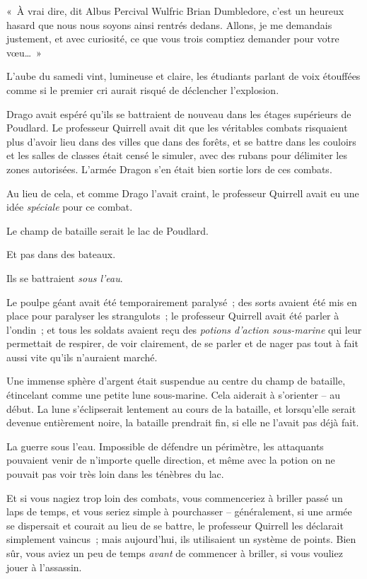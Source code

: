 «~À vrai dire, dit Albus Percival Wulfric Brian Dumbledore, c'est un heureux hasard que nous nous soyons ainsi rentrés dedans. Allons, je me demandais justement, et avec curiosité, ce que vous trois comptiez demander pour votre vœu…~»

\later

L'aube du samedi vint, lumineuse et claire, les étudiants parlant de voix étouffées comme si le premier cri aurait risqué de déclencher l'explosion.

\later

Drago avait espéré qu'ils se battraient de nouveau dans les étages supérieurs de Poudlard. Le professeur Quirrell avait dit que les véritables combats risquaient plus d'avoir lieu dans des villes que dans des forêts, et se battre dans les couloirs et les salles de classes était censé le simuler, avec des rubans pour délimiter les zones autorisées. L'armée Dragon s'en était bien sortie lors de ces combats.

Au lieu de cela, et comme Drago l'avait craint, le professeur Quirrell avait eu une idée \emph{spéciale} pour ce combat.

Le champ de bataille serait le lac de Poudlard.

Et pas dans des bateaux.

Ils se battraient \emph{sous l'eau}.

Le poulpe géant avait été temporairement paralysé~; des sorts avaient été mis en place pour paralyser les strangulots~; le professeur Quirrell avait été parler à l'ondin~; et tous les soldats avaient reçu des \emph{potions d'action sous-marine} qui leur permettait de respirer, de voir clairement, de se parler et de nager pas tout à fait aussi vite qu'ils n'auraient marché.

Une immense sphère d'argent était suspendue au centre du champ de bataille, étincelant comme une petite lune sous-marine. Cela aiderait à s'orienter -- au début. La lune s'éclipserait lentement au cours de la bataille, et lorsqu'elle serait devenue entièrement noire, la bataille prendrait fin, si elle ne l'avait pas déjà fait.

La guerre sous l'eau. Impossible de défendre un périmètre, les attaquants pouvaient venir de n'importe quelle direction, et même avec la potion on ne pouvait pas voir très loin dans les ténèbres du lac.

Et si vous nagiez trop loin des combats, vous commenceriez à briller passé un laps de temps, et vous seriez simple à pourchasser -- généralement, si une armée se dispersait et courait au lieu de se battre, le professeur Quirrell les déclarait simplement vaincus~; mais aujourd'hui, ils utilisaient un système de points. Bien sûr, vous aviez un peu de temps \emph{avant} de commencer à briller, si vous vouliez jouer à l'assassin.

